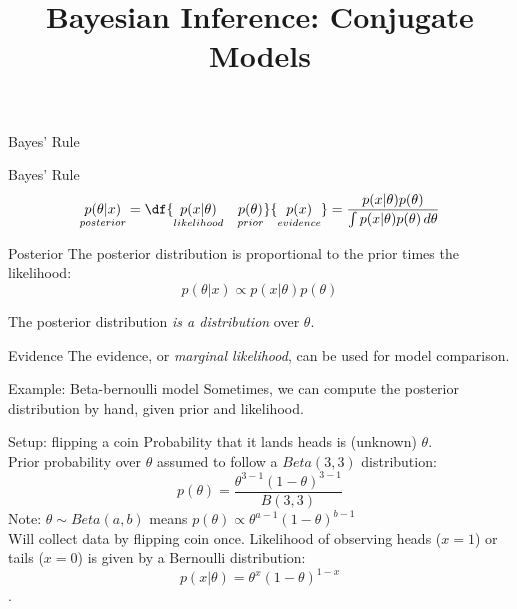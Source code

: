 \documentclass[10pt]{beamer}
\title{Bayesian Inference: Conjugate Models}
\begin{document}
\maketitle






\begin{frame}{Bayes' Rule}
\footnotesize

\begin{sblock}{Bayes' Rule}
\[ \underset{posterior}{p(\theta|x)} = \df{ \underset{likelihood}{p(x|\theta)} \quad  \underset{prior}{p(\theta)} }{ \underset{evidence}{p(x)}}  = \dfrac{p(x | \theta) p(\theta)}{\int p(x | \theta) p(\theta) \, d\theta}  \]
\end{sblock}

\begin{sblock}{Posterior}
The posterior distribution is proportional to the prior times the likelihood:
\[p(\theta | x) \propto p(x | \theta) p(\theta)\]

The posterior distribution \textit{is a distribution} over $\theta$.

\end{sblock}

\begin{sblock}{Evidence}
The evidence, or \textit{marginal likelihood}, can be used for model comparison.
\end{sblock}

\end{frame}



\begin{frame}{Example: Beta-bernoulli model}
Sometimes, we can compute the posterior distribution by hand, given prior and likelihood.

\begin{sblock}{Setup: flipping a coin}
Probability that it lands heads is (unknown) $\theta$. \\
Prior probability over $\theta$ assumed to follow a $Beta(3,3)$ distribution:
$$ p(\theta) = \frac{\theta^{3-1}(1-\theta)^{3-1}}{B(3,3)}$$
Note: $\theta \sim Beta(a, b)$ means $p(\theta) \propto \theta^{a-1}(1-\theta)^{b-1}$\\
Will collect data by flipping coin once. Likelihood of observing heads ($x=1$) or tails ($x=0$) is given by a Bernoulli distribution:
$$p(x | \theta) = \theta^x(1-\theta)^{1-x} $$.
\end{sblock}


\end{frame}
\end{document}
